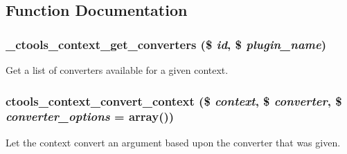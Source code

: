\subsection{Function Documentation}
\hypertarget{context_8inc_a218746c9588a6a7818f4d9513bea95b7}{
\subsubsection[{\_\-ctools\_\-context\_\-get\_\-converters}]{\setlength{\rightskip}{0pt plus 5cm}\_\-ctools\_\-context\_\-get\_\-converters (\$ {\em id}, \/  \$ {\em plugin\_\-name})}}
\label{context_8inc_a218746c9588a6a7818f4d9513bea95b7}
Get a list of converters available for a given context. \hypertarget{context_8inc_ae0ec8854edb77367c1fc4d39a20698d6}{
\subsubsection[{ctools\_\-context\_\-convert\_\-context}]{\setlength{\rightskip}{0pt plus 5cm}ctools\_\-context\_\-convert\_\-context (\$ {\em context}, \/  \$ {\em converter}, \/  \$ {\em converter\_\-options} = {\ttfamily array()})}}
\label{context_8inc_ae0ec8854edb77367c1fc4d39a20698d6}
Let the context convert an argument based upon the converter that was given.


